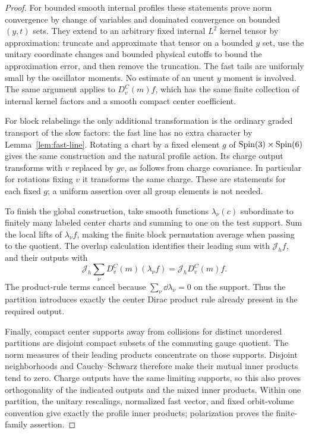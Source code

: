\begin{proof}
For bounded smooth internal profiles these statements prove norm
convergence by change of variables and dominated convergence on
bounded $(y,t)$ sets. They extend to an arbitrary fixed internal
$L^2$ kernel tensor by approximation: truncate and approximate
that tensor on a bounded $y$ set, use the unitary coordinate
changes and bounded physical cutoffs to bound the approximation
error, and then remove the truncation. The fast tails are
uniformly small by the oscillator moments. No estimate of an
uncut $y$ moment is involved. The same argument applies to
$D_v^C(m)f$, which has the same finite collection of internal
kernel factors and a smooth compact center coefficient.

For block relabelings the only additional transformation is the
ordinary graded transport of the slow factors: the fast line
has no extra character by Lemma~\ref{lem:fast-line}. Rotating a
chart by a fixed element $g$ of $\operatorname{Spin}(3)\times\operatorname{Spin}(6)$ gives
the same construction and the natural profile action. Its
charge output transforms with $v$ replaced by $gv$, as follows
from charge covariance. In particular for rotations fixing
$v$ it transforms the same charge. These are statements for
each fixed $g$; a uniform assertion over all group elements is
not needed.

To finish the global construction, take smooth functions
$\lambda_\nu(c)$ subordinate to finitely many labeled center
charts and summing to one on the test support. Sum the local
lifts of $\lambda_\nu f$, making the finite block permutation
average when passing to the quotient. The overlap calculation
identifies their leading sum with $\mathcal J_hf$, and their
outputs with
\[
 \mathcal J_h\sum_\nu D_v^C(m)(\lambda_\nu f)
                         =\mathcal J_hD_v^C(m)f.
\]
The product-rule terms cancel because
$\sum_\nu\dd\lambda_\nu=0$ on the support. Thus the partition
introduces exactly the center Dirac product rule already
present in the required output.

Finally, compact center supports away from collisions for
distinct unordered partitions are disjoint compact subsets
of the commuting gauge quotient. The norm measures of their
leading products concentrate on those supports. Disjoint
neighborhoods and Cauchy--Schwarz therefore make their mutual
inner products tend to zero. Charge outputs have the same
limiting supports, so this also proves orthogonality of the
indicated outputs and the mixed inner products. Within one
partition, the unitary rescalings, normalized fast vector, and
fixed orbit-volume convention give exactly the profile inner
products; polarization proves the finite-family assertion.
\end{proof}


